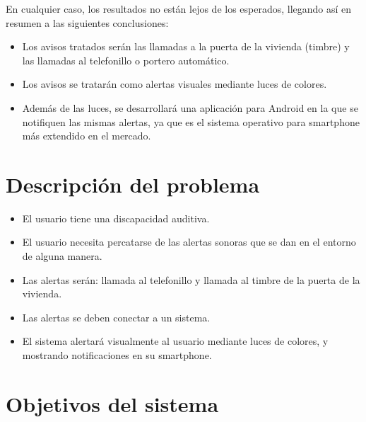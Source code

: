     En cualquier caso, los resultados no están lejos de los esperados, llegando así en resumen a las siguientes conclusiones:
    \begin{itemize}
        \item Los avisos tratados serán las llamadas a la puerta de la vivienda (timbre) y las llamadas al telefonillo o portero automático.
        \item Los avisos se tratarán como alertas visuales mediante luces de colores.
        \item Además de las luces, se desarrollará una aplicación para Android en la que se notifiquen las mismas alertas, ya que es el sistema operativo para smartphone más extendido en el mercado.
    \end{itemize}

\section{Descripción del problema}
    \begin{itemize}
        \item El usuario tiene una discapacidad auditiva.
        \item El usuario necesita percatarse de las alertas sonoras que se dan en el entorno de alguna manera.
        \item Las alertas serán: llamada al telefonillo y llamada al timbre de la puerta de la vivienda.
        \item Las alertas se deben conectar a un sistema.
        \item El sistema alertará visualmente al usuario mediante luces de colores, y mostrando notificaciones en su smartphone.
    \end{itemize}\vspace{-\baselineskip}\mbox{}

\section{Objetivos del sistema}
    \begin{table}[!ht]
        \centering
        \caption{Objetivo 1 del sistema: Alertar a usuario de llamada al timbre.}
        \label{OBJ01}
    \end{table}

